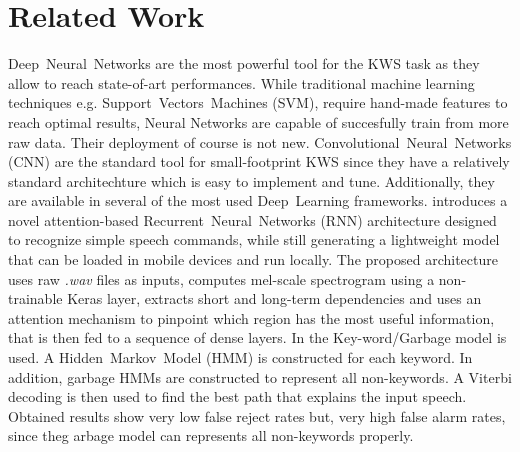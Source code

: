 
\section{Related Work}
\label{sec:related_work}

\noindent 
\mbox{Deep Neural Networks} are the most powerful tool for the KWS task as they allow to reach state-of-art performances. \cite {Jansson-2018} While traditional machine learning techniques e.g. \mbox{Support Vectors Machines} (SVM), require hand-made features to reach optimal results, Neural Networks are capable of succesfully train from more raw data. \cite{Tang-2018} Their deployment of course is not new. \mbox{Convolutional Neural Networks} (CNN) are the standard tool for small-footprint KWS since they have a relatively standard architechture which is easy to implement and tune. Additionally, they are available in several of the most used \mbox{Deep Learning} frameworks. \cite{Andrade-2018} introduces a novel attention-based \mbox{Recurrent Neural Networks} (RNN) architecture designed to recognize simple speech commands, while still generating a lightweight model that can be loaded in mobile devices and run locally. The proposed architecture uses raw {\it .wav} files as inputs, computes mel-scale spectrogram using a non-trainable Keras layer, extracts short and long-term dependencies and uses an attention mechanism to pinpoint which region has the most useful information, that is then fed to a sequence of dense layers. In \cite{Zang-2018} the \mbox{Key-word/Garbage} model is used. A \mbox{Hidden Markov Model} (HMM) is constructed for each keyword. In addition, garbage HMMs are constructed to represent all non-keywords. A Viterbi decoding is then used to find the best path that explains the input speech. Obtained results show very low false reject rates but, very high false alarm rates, since theg arbage model can represents all non-keywords properly.

%
